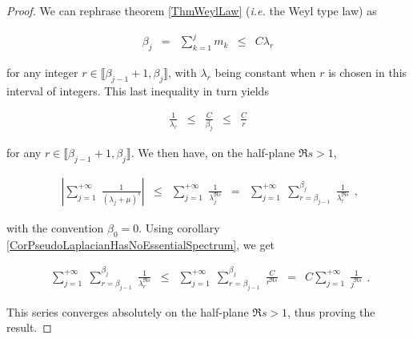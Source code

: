 \documentclass{jams-l}
\theoremstyle{definition}
\theoremstyle{remark}
\numberwithin{equation}{section}
\begin{document}
        \begin{proof}
            
            We can rephrase theorem \ref{ThmWeylLaw} (\textit{i.e.} the Weyl type law) as
            
            \[ \begin{array}{lllll}
                    \beta_j & = & \sum\limits_{k=1}^j m_k & \leqslant & C \lambda_r
                \end{array} \]
            
            \noindent for any integer $r \in \llbracket \beta_{j-1}+1, \beta_j \rrbracket$, with $\lambda_r$ being constant when $r$ is chosen in this interval of integers. This last inequality in turn yields
            
            \[ \begin{array}{lllll}
                    \frac{1}{\lambda_r} & \leqslant & \frac{C}{\beta_j} & \leqslant & \frac{C}{r}
                \end{array}\]
            
            \noindent for any $r \in \llbracket \beta_{j-1}+1, \beta_j \rrbracket$. We then have, on the half-plane $\Re s > 1$,
            
            \[ \begin{array}{lllll}
                    \left \vert \sum\limits_{j=1}^{+ \infty} \; \frac{1}{\left( \lambda_j + \mu \right)^s} \right \vert & \leqslant & \sum\limits_{j=1}^{+ \infty} \; \frac{1}{\lambda_j^{\Re s}} & = & \sum\limits_{j=1}^{+ \infty} \; \sum\limits_{r = \beta_{j-1}}^{\beta_j} \; \frac{1}{\lambda_r^{\Re s}}
                \end{array} , \]
            
            \noindent with the convention $\beta_0 = 0$. Using corollary \ref{CorPseudoLaplacianHasNoEssentialSpectrum}, we get
            
            \[ \begin{array}{lllll}
                    \sum\limits_{j=1}^{+ \infty} \; \sum\limits_{r = \beta_{j-1}}^{\beta_j} \; \frac{1}{\lambda_r^{\Re s}} & \leqslant & \sum\limits_{j=1}^{+ \infty} \; \sum\limits_{r = \beta_{j-1}}^{\beta_j} \; \frac{C}{r^{\Re s}} & = & C \sum\limits_{j=1}^{+ \infty} \; \frac{1}{j^{\Re s}}
                \end{array} . \]
            
            \noindent This series converges absolutely on the half-plane $\Re s > 1$, thus proving the result.
        
        \end{proof}
        
\end{document}
